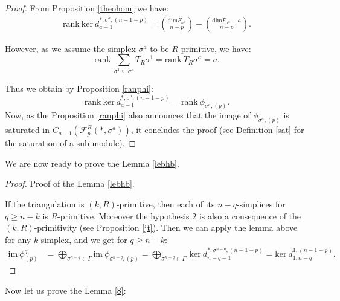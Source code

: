 \documentclass{article}
\begin{document}
\begin{proof}
    From Proposition \ref{theohom} we have:
    \begin{align*}
        \mathrm{rank}~\mathrm{ker}~ d^{*,\sigma^a,(n-1-p)}_{a-1} = \binom{\mathrm{dim}F_{\sigma^a}}{n-p}-\binom{\mathrm{dim}F_{\sigma^a}-a}{n-p}.
    \end{align*}

    However, as we assume the simplex $\sigma^a$ to be $R$-primitive, we have:
    \begin{equation*}
        \mathrm{rank}~\sum_{\sigma^1 \subseteq \sigma^a}T_R\sigma^1 = \mathrm{rank}~T_R\sigma^a = a.
    \end{equation*}

    Thus we obtain by Proposition \ref{ranphi}:
    \begin{equation*}
        \mathrm{rank}~\mathrm{ker}~ d^{*,\sigma^a,(n-1-p)}_{a-1} =\mathrm{rank}~\phi_{\sigma^a,(p)}.
    \end{equation*}
    Now, as the Proposition \ref{ranphi} also announces that the image of $\phi_{\sigma^a,(p)}$ is saturated in $C_{a-1}(\mathcal{F}_p^R(*,\sigma^a))$, it concludes the proof (see Definition \ref{sat} for the saturation of a sub-module).
\end{proof}

We are now ready to prove the Lemma \ref{lebhb}.

\begin{proof}
    Proof of the Lemma \ref{lebhb}.

    If the triangulation is $(k,R)$-primitive, then each of its $n-q$-simplices for $q\geq n-k$ is $R$-primitive. Moreover the hypothesis $2$ is also a consequence of the $(k,R)$-primitivity (see Proposition \ref{jt}). Then we can apply the lemma above for any $k$-simplex, and we get for $q \geq n-k$:
    \begin{align*}
        \mathrm{im} ~ \phi^q_{(p)} &=\bigoplus_{\sigma^{n-q}\in\Gamma}\mathrm{im}~\phi_{\sigma^{n-q},(p)} = \bigoplus_{\sigma^{n-q}\in\Gamma}~ \mathrm{ker} ~d^{*,\sigma^{n-q},(n-1-p)}_{n-q-1} = \mathrm{ker}~ d^{1,(n-1-p)}_{1,n-q}.
    \end{align*}
\end{proof}

Now let us prove the Lemma \ref{8}:
\end{document}
